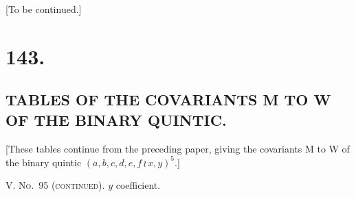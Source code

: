 \documentclass[11pt,a4paper]{book}
\begin{document}
\vspace{2ex}
\begin{center}
[To be continued.]
\
\clearpage


\setlength{\parindent}{1.5em}
\setlength{\parskip}{0pt plus 1pt}


\clearpage
\section*{143.}
\subsection*{TABLES OF THE COVARIANTS M TO W OF THE BINARY QUINTIC.}

[These tables continue from the preceding paper, giving the covariants M to W
of the binary quintic $(a, b, c, d, e, f \, \wr\, x, y)^5$.]

\bigskip
\noindent\textsc{V. No.~95 (continued).} $y$ coefficient.


\end{center}
\end{document}
